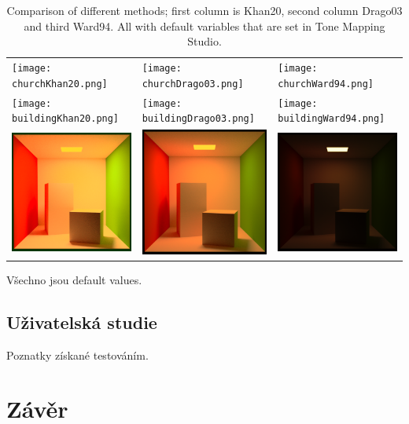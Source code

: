 \documentclass[11pt,a4paper,oneside]{article}
\begin{document}
\begin{table}[h]
    \centering
    \caption{Comparison of different methods; first column is Khan20, second
    column Drago03 and third Ward94. All with default variables that are set in
    Tone Mapping Studio.}
    \label{tab:method-comp}
    \begin{tabular}{lll}
        \texttt{[image: churchKhan20.png]} &
        \texttt{[image: churchDrago03.png]} &
        \texttt{[image: churchWard94.png]} \\
    \texttt{[image: buildingKhan20.png]} &
        \texttt{[image: buildingDrago03.png]} &
        \texttt{[image: buildingWard94.png]}\\
    \includegraphics[width=.3\linewidth,valign=m]{cornell_boxKhan20.png} &
        \includegraphics[width=.3\linewidth,valign=m]{cornell_boxDrago03.png} &
        \includegraphics[width=.3\linewidth,valign=m]{cornell_boxWard94.png}\\
    \end{tabular}
\end{table}

Všechno jsou default values.

\subsection{Uživatelská studie}

Poznatky získané testováním.


\section{Závěr}



\end{document}
